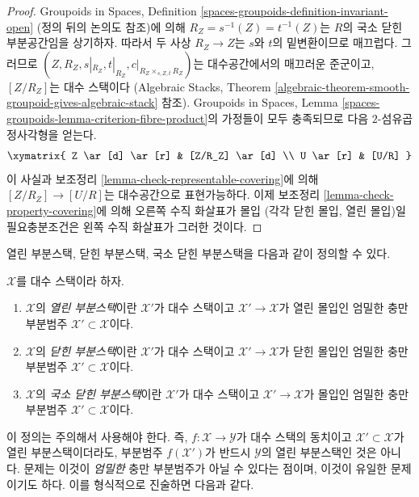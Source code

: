 \begin{proof}
Groupoids in Spaces,
Definition \ref{spaces-groupoids-definition-invariant-open}
(정의 뒤의 논의도 참조)에 의해
$R_Z = s^{-1}(Z) = t^{-1}(Z)$는 $R$의 국소 닫힌 부분공간임을 상기하자.
따라서 두 사상 $R_Z \to Z$는 $s$와 $t$의 밑변환이므로 매끄럽다. 그러므로
$(Z, R_Z, s|_{R_Z}, t|_{R_Z}, c|_{R_Z \times_{s, Z, t} R_Z})$는
대수공간에서의 매끄러운 준군이고, $[Z/R_Z]$는 대수 스택이다
(Algebraic Stacks,
Theorem \ref{algebraic-theorem-smooth-groupoid-gives-algebraic-stack} 참조).
Groupoids in Spaces,
Lemma \ref{spaces-groupoids-lemma-criterion-fibre-product}의 가정들이
모두 충족되므로 다음 $2$-섬유곱 정사각형을 얻는다.
$$
\xymatrix{
Z \ar[d] \ar[r] & [Z/R_Z] \ar[d] \\
U \ar[r] & [U/R]
}
$$
이 사실과 보조정리 \ref{lemma-check-representable-covering}에 의해
$[Z/R_Z] \to [U/R]$는 대수공간으로 표현가능하다.
이제 보조정리 \ref{lemma-check-property-covering}에 의해 오른쪽 수직 화살표가
몰입 (각각 닫힌 몰입, 열린 몰입)일 필요충분조건은 왼쪽 수직 화살표가
그러한 것이다.
\end{proof}

\noindent
열린 부분스택, 닫힌 부분스택, 국소 닫힌 부분스택을 다음과 같이 정의할 수 있다.

\begin{definition}
\label{definition-substacks}
$\mathcal{X}$를 대수 스택이라 하자.
\begin{enumerate}
\item $\mathcal{X}$의 {\it 열린 부분스택}이란 $\mathcal{X}'$가 대수 스택이고
$\mathcal{X}' \to \mathcal{X}$가 열린 몰입인 엄밀한 충만 부분범주
$\mathcal{X}' \subset \mathcal{X}$이다.
\item $\mathcal{X}$의 {\it 닫힌 부분스택}이란 $\mathcal{X}'$가 대수 스택이고
$\mathcal{X}' \to \mathcal{X}$가 닫힌 몰입인 엄밀한 충만 부분범주
$\mathcal{X}' \subset \mathcal{X}$이다.
\item $\mathcal{X}$의 {\it 국소 닫힌 부분스택}이란 $\mathcal{X}'$가 대수 스택이고
$\mathcal{X}' \to \mathcal{X}$가 몰입인 엄밀한 충만 부분범주
$\mathcal{X}' \subset \mathcal{X}$이다.
\end{enumerate}
\end{definition}

\noindent
이 정의는 주의해서 사용해야 한다. 즉,
$f : \mathcal{X} \to \mathcal{Y}$가 대수 스택의 동치이고
$\mathcal{X}' \subset \mathcal{X}$가 열린 부분스택이더라도,
부분범주 $f(\mathcal{X}')$가 반드시 $\mathcal{Y}$의 열린 부분스택인 것은 아니다.
문제는 이것이 {\it 엄밀한} 충만 부분범주가 아닐 수 있다는 점이며,
이것이 유일한 문제이기도 하다. 이를 형식적으로 진술하면 다음과 같다.

